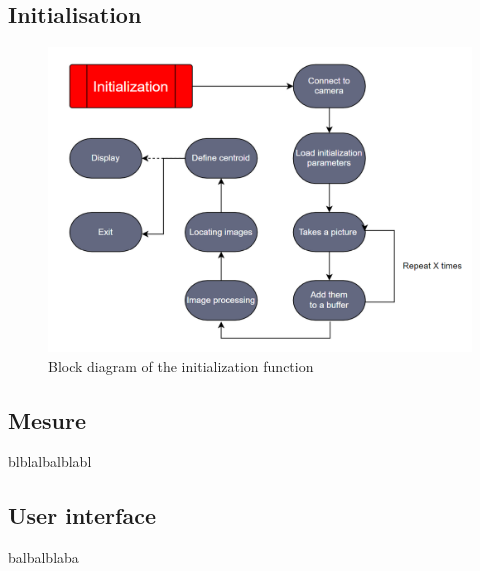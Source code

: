 \subsection{Initialisation}
\begin{figure}[H]
    \centering
    \includegraphics[scale=0.85]{assets/figures/Software/Initialization.png}
    \caption{Block diagram of the initialization function}
    \label{fig:Soft_Init}
\end{figure}
\subsection{Mesure}
blblalbalblabl
\subsection{User interface}
balbalblaba